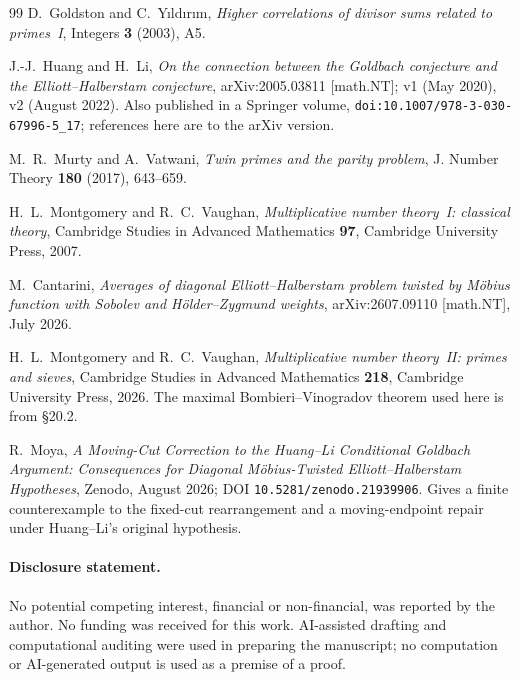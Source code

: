 \documentclass[11pt,a4paper]{article}
\theoremstyle{plain}
\theoremstyle{definition}
\theoremstyle{remark}
\begin{document}
\begin{thebibliography}{99} D.~Goldston and C.~Y{\i}ld{\i}r{\i}m,
\emph{Higher correlations of divisor sums related to primes~I},
Integers \textbf{3} (2003), A5.

 J.-J.~Huang and H.~Li, \emph{On the connection between
the Goldbach conjecture and the Elliott--Halberstam conjecture},
arXiv:2005.03811 [math.NT]; v1 (May 2020), v2 (August 2022). Also published in a Springer volume,
\texttt{doi:10.1007/978-3-030-67996-5\_17}; references here are to the
arXiv version.

 M.~R.~Murty and A.~Vatwani, \emph{Twin primes and
the parity problem}, J. Number Theory \textbf{180} (2017), 643--659.

 H.~L.~Montgomery and R.~C.~Vaughan,
\emph{Multiplicative number theory~I: classical theory}, Cambridge
Studies in Advanced Mathematics \textbf{97}, Cambridge University
Press, 2007.

 M.~Cantarini,
\emph{Averages of diagonal Elliott--Halberstam problem twisted by
M\"obius function with Sobolev and H\"older--Zygmund weights},
arXiv:2607.09110 [math.NT], July 2026.

 H.~L.~Montgomery and R.~C.~Vaughan,
\emph{Multiplicative number theory~II: primes and sieves}, Cambridge
Studies in Advanced Mathematics \textbf{218}, Cambridge University
Press, 2026.  The maximal Bombieri--Vinogradov theorem used here is
from \S20.2.

 R.~Moya, \emph{A Moving-Cut Correction to the
Huang--Li Conditional Goldbach Argument: Consequences for Diagonal
M\"obius-Twisted Elliott--Halberstam Hypotheses}, Zenodo, August 2026;
DOI \texttt{10.5281/zenodo.21939906}. Gives a finite counterexample to the fixed-cut rearrangement and a
moving-endpoint repair under Huang--Li's original hypothesis.

\end{thebibliography}

\paragraph{Disclosure statement.} No potential competing interest, financial or non-financial, was
reported by the author. No funding was received for this work. AI-assisted
drafting and computational auditing were used in preparing the manuscript;
no computation or AI-generated output is used as a premise of a proof.
\end{document}
